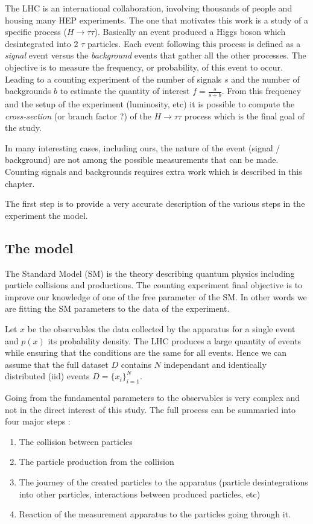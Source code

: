 The LHC is an international collaboration, involving thousands of people and housing many HEP experiments.
The one that motivates this work is a study of a specific process ($H \to \tau \tau$).
Basically an event produced a Higgs boson which desintegrated into 2 $\tau$ particles.
Each event following this process is defined as a \emph{signal} event versus the \emph{background} events that gather all the other processes.
The objective is to measure the frequency, or probability, of this event to occur.
Leading to a counting experiment of the number of signals $s$ and the number of backgrounds $b$ to estimate the quantity of interest $f = \frac{s}{s + b}$.
From this frequency and the setup of the experiment (luminosity, etc) it is possible to compute the \emph{cross-section} (or branch factor ?) of the $H \to \tau \tau$ process which is the final goal of the study.

In many interesting cases, including ours, the nature of the event (signal / background) are not among the possible measurements that can be made.
Counting signals and backgrounds requires extra work which is described in this chapter.

The first step is to provide a very accurate description of the various steps in the experiment \ie the model.






\subsection{The model} %
\label{sub:the_model}

The Standard Model \needcite (SM) is the theory describing quantum physics including particle collisions and productions.
The counting experiment final objective is to improve our knowledge of one of the free parameter of the SM.
In other words we are fitting the SM parameters to the data of the experiment.

Let $x$ be the observables \ie the data collected by the apparatus for a single event and $p(x)$ its probability density.
The LHC produces a large quantity of events while ensuring that the conditions are the same for all events.
Hence we can assume that the full dataset $D$ contains $N$ independant and identically distributed (iid) events $D = \{x_i\}_{i=1}^N$.

Going from the fundamental parameters to the observables is very complex and not in the direct interest of this study.
The full process can be summaried into four major steps :
\begin{enumerate}
	\item The collision between particles
	\item The particle production from the collision
	\item The journey of the created particles to the apparatus (particle desintegrations into other particles, interactions between produced particles, etc)
	\item Reaction of the measurement apparatus to the particles going through it.
\end{enumerate}

